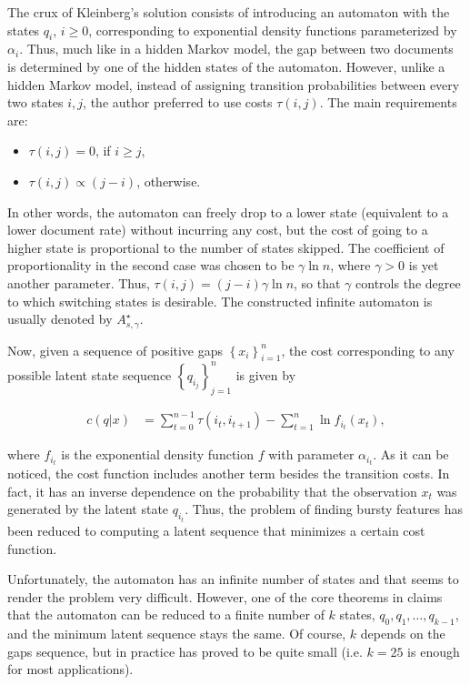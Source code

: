 The crux of Kleinberg's solution consists of introducing an automaton with the states $q_i$, $i \geq 0$, corresponding to exponential density functions parameterized by $\alpha_i$. Thus, much like in a hidden Markov model, the gap between two documents is determined by one of the hidden states of the automaton. However, unlike a hidden Markov model, instead of assigning transition probabilities between every two states $i, j$, the author preferred to use costs $\tau \left( i, j \right)$. The main requirements are:

\begin{itemize}
\item $\tau \left( i, j \right) = 0$, if $i \geq j$,
\item $\tau \left( i, j \right) \propto (j - i)$, otherwise.
\end{itemize}

In other words, the automaton can freely drop to a lower state (equivalent to a lower document rate) without incurring any cost, but the cost of going to a higher state is proportional to the number of states skipped. The coefficient of proportionality in the second case was chosen to be $\gamma \ln n$, where $\gamma > 0$ is yet another parameter. Thus, $\tau \left( i, j \right) = \left( j - i \right) \gamma \ln n$, so that $\gamma$ controls the degree to which switching states is desirable. The constructed infinite automaton is usually denoted by $A_{s, \gamma}^{\star}$.

Now, given a sequence of positive gaps $\left\{ x_i \right\}_{i=1}^{n}$, the cost corresponding to any possible latent state sequence $\left\{ q_{i_j} \right\}_{j=1}^{n}$ is given by

\begin{align}
\label{eq:positive-gaps}
c \left( q | x \right) &= \sum_{t=0}^{n-1} \tau \left( i_t, i_{t + 1} \right) - \sum_{t=1}^{n} \ln f_{i_t} \left( x_t \right),
\end{align}

where $f_{i_t}$ is the exponential density function $f$ with parameter $\alpha_{i_t}$. As it can be noticed, the cost function includes another term besides the transition costs. In fact, it has an inverse dependence on the probability that the observation $x_t$ was generated by the latent state $q_{i_t}$. Thus, the problem of finding bursty features has been reduced to computing a latent sequence that minimizes a certain cost function.

Unfortunately, the automaton has an infinite number of states and that seems to render the problem very difficult. However, one of the core theorems in \cite{Kleinberg:2002:BHS:775047.775061} claims that the automaton can be reduced to a finite number of $k$ states, $q_0, q_1, \ldots, q_{k-1}$, and the minimum latent sequence stays the same. Of course, $k$ depends on the gaps sequence, but in practice has proved to be quite small (i.e. $k = 25$ is enough for most applications).

